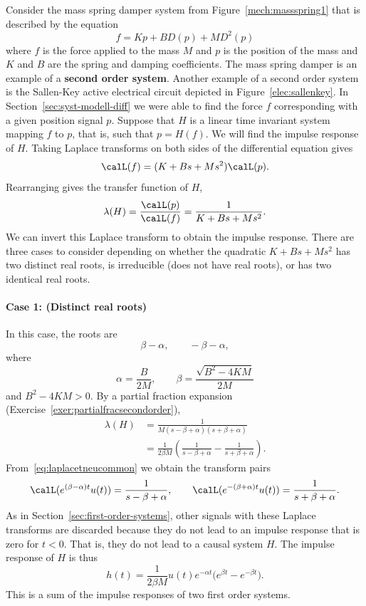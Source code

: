 \documentclass[11pt,a4paper]{book}
\theoremstyle{plain}
\numberwithin{equation}{section}
\newcommand{\term}{\textbf}
\begin{document}
Consider the mass spring damper system from Figure~\ref{mech:massspring1} that is described by the equation
\begin{equation}\label{eq:masspringeqseclapltrans}
f = K p + B D(p) + M D^2(p)
\end{equation}
where $f$ is the force applied to the mass $M$ and $p$ is the position of the mass and $K$ and $B$ are the spring and damping coefficients.  The mass spring damper is an example of a \term{second order system}.  Another example of a second order system is the Sallen-Key active electrical circuit depicted in Figure~\ref{elec:sallenkey}.  In Section~\ref{sec:syst-modell-diff} we were able to find the force $f$ corresponding with a given position signal $p$.  Suppose that $H$ is a linear time invariant system mapping $f$ to $p$, that is, such that $p = H(f)$.  We will find the impulse response of $H$.  Taking Laplace transforms on both sides of the differential equation gives
\[
\calL(f) = (K + B s + M s^2) \calL(p).
\]
Rearranging gives the transfer function of $H$,
\[
\lambda(H) = \frac{\calL(p)}{\calL(f)} =  \frac{1}{K + B s + M s^2}.
\]
We can invert this Laplace transform to obtain the impulse response.  There are three cases to consider depending on whether the quadratic $K + Bs + Ms^2$ has two distinct real roots, is irreducible (does not have real roots), or has two identical real roots.

\paragraph{Case 1: (Distinct real roots)}
In this case, the roots are
\[
\beta-\alpha, \qquad  -\beta-\alpha,
\] 
where 
\[
\alpha = \frac{B}{2M}, \qquad  \beta = \frac{\sqrt{B^2 - 4KM}}{2M}
\]
and $B^2 - 4KM > 0$.  By a partial fraction expansion (Exercise~\ref{exer:partialfracsecondorder}),
\begin{align*}
\lambda(H) &= \frac{1}{M(s - \beta+\alpha)(s + \beta + \alpha)} \\
&= \frac{1}{2\beta M}\left( \frac{1}{s-\beta+\alpha} - \frac{1}{s+\beta+\alpha} \right).
\end{align*}
From~\eqref{eq:laplacetneucommon} we obtain the transform pairs
\[
\calL(e^{(\beta-\alpha)t} u(t)) = \frac{1}{s-\beta+\alpha}, \qquad \calL(e^{-(\beta+\alpha) t} u(t)) = \frac{1}{s+\beta+\alpha}.
\]
As in Section~\ref{sec:first-order-systems}, other signals with these Laplace transforms are discarded because they do not lead to an impulse response that is zero for $t < 0$.  That is, they do not lead to a causal system $H$.  The impulse response of $H$ is thus
\[
h(t) = \frac{1}{2 \beta M} u(t) e^{-\alpha t} \big( e^{\beta t} - e^{-\beta t} \big).
\]
This is a sum of the impulse responses of two first order systems.
\end{document}
